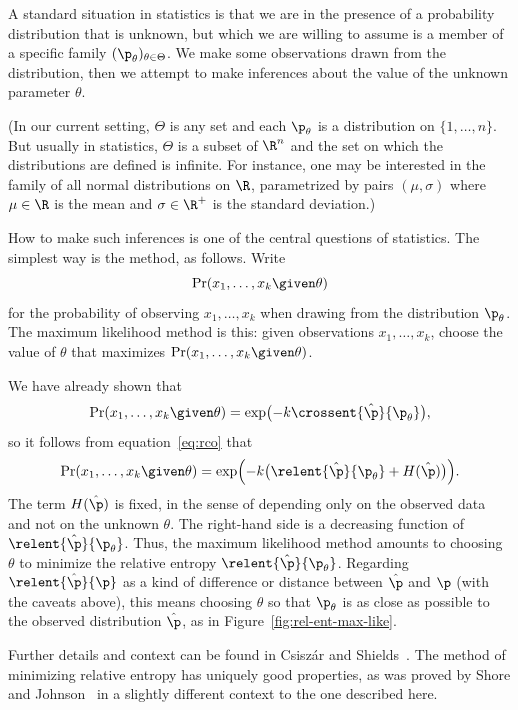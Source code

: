 A standard situation in statistics is that we are in the presence of a
probability distribution that is unknown, but which we are willing to
assume is a member of a specific family $(\p_\theta)_{\theta \in \Theta}$.
We make some observations drawn from the distribution, then we attempt to
make inferences about the value of the unknown parameter
$\theta$. 

(In our current setting, $\Theta$ is any set and each $\p_\theta$ is a
distribution on $\{1, \ldots, n\}$.  But usually in statistics, $\Theta$ is
a subset of $\R^n$ and the set on which the distributions are defined is
infinite.  For instance, one may be interested in the family of all normal
distributions on $\R$, parametrized by pairs $(\mu, \sigma)$ where $\mu \in
\R$ is the mean and $\sigma \in \R^+$ is the standard deviation.)

How to make such inferences is one of the central questions of statistics.
The simplest way is the  method, as follows.  Write
\[
\Pr(x_1, \ldots, x_k \given \theta) 
\]
for the probability of observing $x_1, \ldots, x_k$ when drawing from the
distribution $\p_\theta$.  The maximum likelihood method is this: given
observations $x_1, \ldots, x_k$, choose the value of $\theta$ that
maximizes $\Pr(x_1, \ldots, x_k \given \theta)$.

We have already shown that
\[
\Pr(x_1, \ldots, x_k \given \theta) 
=
\exp\bigl(-k \crossent{\hat{\p}}{\p_\theta} \bigr),
\]
so it follows from equation~\eqref{eq:rco} that
\[
\Pr(x_1, \ldots, x_k \given \theta) 
=
\exp\Bigl(-k\bigl( \relent{\hat{\p}}{\p_\theta} + H(\hat{\p})
\bigr)\Bigr).
\]
The term $H(\hat{\p})$ is fixed, in the sense of depending only on the
observed data and not on the unknown $\theta$.  The right-hand side is a
decreasing function of $\relent{\hat{\p}}{\p_\theta}$.  Thus, the
maximum likelihood method amounts to choosing $\theta$ to minimize the
relative entropy $\relent{\hat{\p}}{\p_\theta}$.  
% 
Regarding $\relent{\hat{\p}}{\p}$ as a kind of difference or distance
between $\hat{\p}$ and $\p$ (with the caveats above), this means choosing
$\theta$ so that $\p_\theta$ is as close as possible to the observed
distribution $\hat{\p}$, as in Figure~\ref{fig:rel-ent-max-like}.

Further details and context can be found in
Csisz\'ar and Shields~\cite{CsSh}.  The method of minimizing relative
entropy has uniquely good properties, as was proved by Shore and
Johnson~\cite{ShJo} in a slightly different context to the one described
here. 

